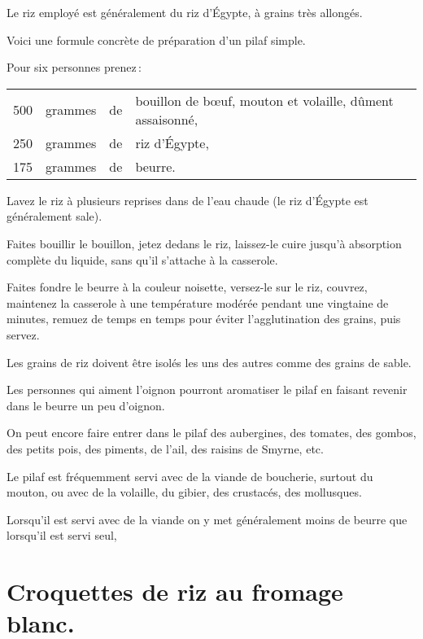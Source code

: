 Le riz employé est généralement du riz d'Égypte, à grains très allongés.

Voici une formule concrète de préparation d'un pilaf simple.

\medskip

Pour six personnes prenez :

\footnotesize
\begin{longtable}{rrrp{16em}}
    500 & grammes & de & bouillon de bœuf, mouton et volaille, dûment assaisonné,                         \\
    250 & grammes & de & riz d'Égypte,                                                                    \\
    175 & grammes & de & beurre.                                                                          \\
\end{longtable}
\normalsize

Lavez le riz à plusieurs reprises dans de l'eau chaude (le riz d'Égypte est
généralement sale).

Faites bouillir le bouillon, jetez dedans le riz, laissez-le cuire jusqu'à
absorption complète du liquide, sans qu'il s'attache à la casserole.

Faites fondre le beurre à la couleur noisette, versez-le sur le riz, couvrez,
maintenez la casserole à une température modérée pendant une vingtaine de
minutes, remuez de temps en temps pour éviter l'agglutination des grains, puis
servez.

Les grains de riz doivent être isolés les uns des autres comme des grains de
sable.

\sk

Les personnes qui aiment l'oignon pourront aromatiser le pilaf en faisant
revenir dans le beurre un peu d'oignon.

\sk

On peut encore faire entrer dans le pilaf des aubergines, des tomates, des
gombos, des petits pois, des piments, de l'ail, des raisins de Smyrne, etc.

\sk

Le pilaf est fréquemment servi avec de la viande de boucherie, surtout du
mouton, ou avec de la volaille, du gibier, des crustacés, des mollusques.

Lorsqu'il est servi avec de la viande on y met généralement moins de beurre
que lorsqu'il est servi seul,

\section*{\centering Croquettes de riz au fromage blanc.}
{}

